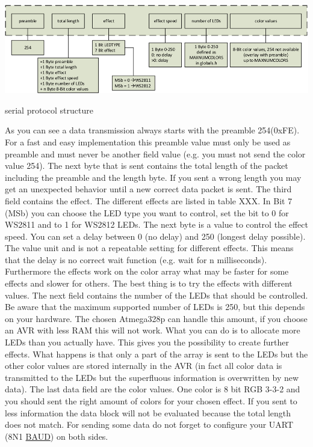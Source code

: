 \begin{DoxyImage}
\includegraphics[width=\textwidth,height=\textheight/2,keepaspectratio=true]{Protoll_V1_2_engl.png}
\caption{serial protocol structure}
\end{DoxyImage}
 As you can see a data transmission always starts with the preamble 254(0x\+F\+E). For a fast and easy implementation this preamble value must only be used as preamble and must never be another field value (e.\+g. you must not send the color value 254). The next byte that is sent contains the total length of the packet including the preamble and the length byte. If you sent a wrong length you may get an unexpected behavior until a new correct data packet is sent. The third field contains the effect. The different effects are listed in table X\+X\+X. In Bit 7 (M\+Sb) you can choose the L\+E\+D type you want to control, set the bit to 0 for W\+S2811 and to 1 for W\+S2812 L\+E\+Ds. The next byte is a value to control the effect speed. You can set a delay between 0 (no delay) and 250 (longest delay possible). The value unit and is not a repeatable setting for different effects. This means that the delay is no correct wait function (e.\+g. wait for n milliseconds). Furthermore the effects work on the color array what may be faster for some effects and slower for others. The best thing is to try the effects with different values. The next field contains the number of the L\+E\+Ds that should be controlled. Be aware that the maximum supported number of L\+E\+Ds is 250, but this depends on your hardware. The chosen Atmega328p can handle this amount, if you choose an A\+V\+R with less R\+A\+M this will not work. What you can do is to allocate more L\+E\+Ds than you actually have. This gives you the possibility to create further effects. What happens is that only a part of the array is sent to the L\+E\+Ds but the other color values are stored internally in the A\+V\+R (in fact all color data is transmitted to the L\+E\+Ds but the superfluous information is overwritten by new data). The last data field are the color values. One color is 8 bit R\+G\+B 3-\/3-\/2 and you should sent the right amount of colors for your chosen effect. If you sent to less information the data block will not be evaluated because the total length does not match. For sending some data do not forget to configure your U\+A\+R\+T (8\+N1 \hyperlink{ws2811lichterkette_8c_a62634036639f88eece6fbf226b45f84b}{B\+A\+U\+D}) on both sides.

